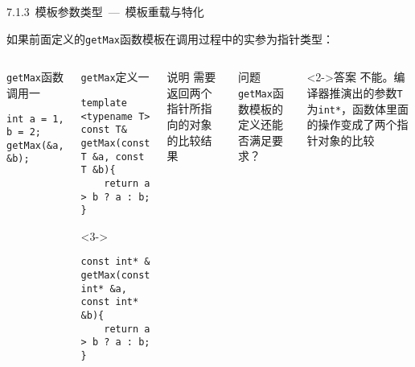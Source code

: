 \begin{frame}[fragile]{7.1.3~模板参数类型\normalsize{~---~模板重载与特化}}

如果前面定义的\texttt{getMax}函数模板在调用过程中的实参为指针类型：

\vspace{-4mm}

\begin{columns}[t]

\begin{blueblock}{\texttt{getMax}函数调用一}
\begin{lstlisting}[moreemph={T}]
int a = 1, b = 2;
getMax(&a, &b);
\end{lstlisting}
\end{blueblock}
\begin{blueblock}{\texttt{getMax}定义一}
\begin{lstlisting}[moreemph={T}]
template <typename T>
const T& getMax(const T &a, const T &b){
    return a > b ? a : b;
}
\end{lstlisting}
\vspace{-2mm}
\begin{onlyenv}<3->
\vspace{-2mm}
\begin{lstlisting}[moreemph={T}]
const int* & getMax(const int* &a, const int* &b){
    return a > b ? a : b;
}
\end{lstlisting}
\end{onlyenv}
\end{blueblock}

\begin{yellowblock}{说明}
需要返回两个指针所指向的对象的比较结果
\end{yellowblock}
\begin{greenblock}{问题}
\texttt{getMax}函数模板的定义还能否满足要求？
\end{greenblock}
\begin{greenblock}<2->{答案}
不能。编译器推演出的参数\texttt{T}为\texttt{int*}，函数体里面的操作变成了两个指针对象的比较
\end{greenblock}

\end{columns}

\end{frame}

